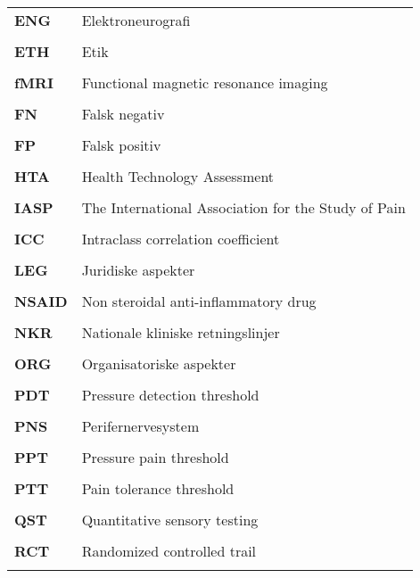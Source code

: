 \begin{longtable}{p{}  p{}}
\textbf{ENG} & Elektroneurografi                                         
\\ \\
\textbf{ETH} & Etik
\\ \\
\textbf{fMRI}& Functional magnetic resonance imaging                    
\\ \\
\textbf{FN}  & Falsk negativ                                           
\\ \\
\textbf{FP}  & Falsk positiv                                           
\\ \\
\textbf{HTA} & Health Technology Assessment 
\\ \\
\textbf{IASP}& The International Association for the Study of Pain      
\\ \\
\textbf{ICC} & Intraclass correlation coefficient                     
\\ \\
\textbf{LEG} & Juridiske aspekter  
\\ \\
\textbf{NSAID} & Non steroidal anti-inflammatory drug                                  
\\ \\
\textbf{NKR} & Nationale kliniske retningslinjer             
\\ \\
\textbf{ORG} & Organisatoriske aspekter                                 
\\ \\
\textbf{PDT} & Pressure detection threshold  
\\ \\
\textbf{PNS} & Perifernervesystem                                      
\\ \\
\textbf{PPT} & Pressure pain threshold                            
\\ \\
\textbf{PTT} & Pain tolerance threshold                                 
\\ \\
\textbf{QST} & Quantitative sensory testing                             
\\ \\
\textbf{RCT} & Randomized controlled trail
\\ \\

\end{longtable}
